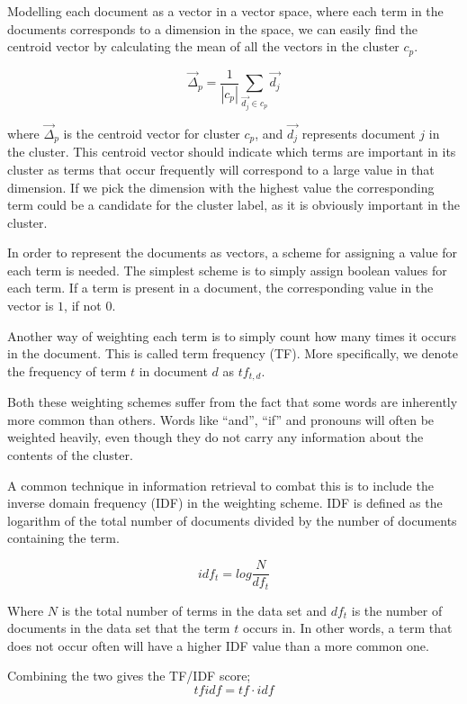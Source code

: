\documentclass[letterpaper, 10 pt, conference]{ieeeconf}
\begin{document}
Modelling each document as a vector in a vector space, where each term in the
documents corresponds to a dimension in the space, we can easily find the
centroid vector by calculating the mean of all the vectors in the cluster $c_p$.

$$
\vec{\Delta}_p = \frac{1}{|c_p|} \sum_{\vec{d_j} \in c_p} \vec{d_j}
$$

where $\vec{\Delta}_p$ is the centroid vector for cluster $c_p$, and $\vec{d_j}$
represents document $j$ in the cluster. This centroid vector should indicate
which terms are important in its cluster as terms that occur frequently will
correspond to a large value in that dimension. If we pick the dimension with the
highest value the corresponding term could be a candidate for the cluster label,
as it is obviously important in the cluster.

In order to represent the documents as vectors, a scheme for assigning a value
for each term is needed. The simplest scheme is to simply assign boolean values
for each term. If a term is present in a document, the corresponding value in
the vector is $1$, if not $0$.

Another way of weighting each term is to simply count how many times it occurs
in the document. This is called term frequency (TF). More specifically, we
denote the frequency of term $t$ in document $d$ as
$tf_{t,d}$.\cite{baeza1999modern}

Both these weighting schemes suffer from the fact that some words are inherently
more common than others. Words like ``and'', ``if'' and pronouns will often be
weighted heavily, even though they do not carry any information about the
contents of the cluster.

A common technique in information retrieval to combat this is to include the
inverse domain frequency (IDF) in the weighting scheme. IDF is defined as the
logarithm of the total number of documents divided by the number of documents
containing the term.

$$
idf_{t} = log \frac{N}{df_t}
$$

Where $N$ is the total number of terms in the data set and $df_t$ is the number
of documents in the data set that the term $t$ occurs in.\cite{baeza1999modern}
In other words, a term that does not occur often will have a higher IDF value
than a more common one.

Combining the two gives the TF/IDF score;
$$
tfidf = tf \cdot idf
$$

\end{document}
